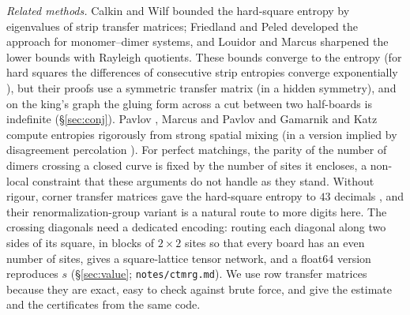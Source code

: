 \documentclass[11pt]{amsart}
\theoremstyle{definition}
\theoremstyle{remark}
\newcommand{\file}[1]{\texttt{#1}}
\begin{document}
\emph{Related methods.} Calkin and Wilf \cite{calkinwilf1998} bounded the hard-square entropy by
eigenvalues of strip transfer matrices; Friedland and Peled \cite{friedlandpeled2005} developed
the approach for monomer--dimer systems, and Louidor and Marcus \cite{louidormarcus2010}
sharpened the lower bounds with Rayleigh quotients. These bounds converge to the entropy (for hard
squares the differences of consecutive strip entropies converge exponentially \cite{pavlov2012}),
but their proofs use a symmetric transfer matrix (in
\cite{friedlandpeled2005} a hidden symmetry), and on the king's graph the gluing form across a
cut between two half-boards is indefinite (\S\ref{sec:conj}). Pavlov \cite{pavlov2012}, Marcus and
Pavlov \cite{marcuspavlov2013} and Gamarnik and Katz \cite{gamarnikkatz2009} compute entropies
rigorously from strong spatial
mixing (in \cite{pavlov2012} a version implied by disagreement percolation \cite{marcuspavlov2013}).
For perfect matchings, the parity of the number of dimers crossing a closed curve is
fixed by the number of sites it encloses, a non-local constraint that these arguments do not
handle as they stand. Without rigour, corner transfer matrices gave the hard-square entropy to
$43$ decimals \cite{baxter1999}, and their renormalization-group variant
\cite{nishinookunishi1996} is a natural route to more digits here. The crossing diagonals need a
dedicated encoding: routing each diagonal along two sides of its square, in blocks of $2 \times 2$
sites so that every board has an even number of sites, gives a square-lattice tensor network, and
a float64 version reproduces $s$ (\S\ref{sec:value}; \file{notes/ctmrg.md}). We use row
transfer matrices because they are exact, easy to check against brute force, and give the
estimate and the certificates from the same code.
\end{document}
